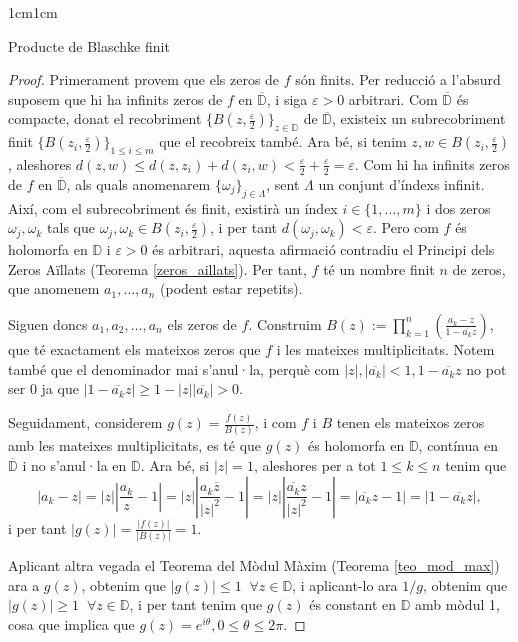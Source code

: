 \begin{adjustwidth}{1cm}{1cm}
\begin{subsection}{Producte de Blaschke finit}
\begin{proof}
        Primerament provem que els zeros de $f$ són finits. Per reducció a l'absurd suposem que hi ha infinits zeros de $f$ en $\overline{\mathbb{D}}$, i siga $\varepsilon>0$ arbitrari. Com $\overline{\mathbb{D}}$ és compacte, donat el recobriment $\{B(z,\frac{\varepsilon}{2})\}_{z\in \mathbb{D}}$ de $\overline{\mathbb{D}}$, existeix un subrecobriment finit $\{B(z_i,\frac{\varepsilon}{2})\}_{1\leq i\leq m}$ que el recobreix també.
        Ara bé, si tenim $z,w\in B(z_i,\frac{\varepsilon}{2})$, aleshores $d(z,w)\leq d(z,z_i)+d(z_i,w)<\frac{\varepsilon}{2}+\frac{\varepsilon}{2}=\varepsilon$. Com hi ha infinits zeros de $f$ en $\overline{\mathbb{D}}$, als quals anomenarem $\{\omega_j\}_{j\in\Lambda}$, sent $\Lambda$ un conjunt d'índexs infinit. Així, com el subrecobriment és finit, existirà un índex $i\in\{1,\dots,m\}$ i dos zeros $\omega_j, \omega_k$ tals que $\omega_j, \omega_k\in B(z_i,\frac{\varepsilon}{2})$, i per tant $d(\omega_j, \omega_k)<\varepsilon$. Pero com $f$ és holomorfa en $\mathbb{D}$ i $\varepsilon>0$ és arbitrari, aquesta afirmació contradiu el Principi dels Zeros Aïllats (Teorema \ref{zeros_aillats}). Per tant, $f$ té un nombre finit $n$ de zeros, que anomenem $a_1,\dots, a_n$ (podent estar repetits).

        Siguen doncs $a_1,a_2,\dots,a_n$ els zeros de $f$. Construim $B(z):=\displaystyle\prod^{n}_{k=1}\left(\frac{a_k-z}{1-\overline{a_k}z}\right)$, que té exactament els mateixos zeros que $f$ i les mateixes multiplicitats. Notem també que el denominador mai s'anul·la, perquè com $|z|,|\overline{a_k}|<1, 1-\overline{a_k}z$ no pot ser $0$ ja que $|1-\overline{a_k}z|\geq 1-|z||\overline{a_k}|>0$.

        Seguidament, considerem $g(z)=\frac{f(z)}{B(z)}$, i com $f$ i $B$ tenen els mateixos zeros amb les mateixes multiplicitats, es té que $g(z)$ és holomorfa en $\mathbb{D}$, contínua en $\overline{\mathbb{D}}$ i no s'anul·la en $\mathbb{D}$. Ara bé, si $|z|=1$, aleshores per a tot $1\leq k\leq n$ tenim que 
        \[
            |a_k-z|=|z|\left|\frac{a_k}{z}-1\right|=|z|\left|\frac{a_k\overline{z}}{|z|^2}-1\right|=|z|\left|\frac{\overline{a_k}z}{|z|^2}-1\right|=|\overline{a_k}z-1|=|1-\overline{a_k}z|,
        \]
        i per tant $|g(z)|=\frac{|f(z)|}{|B(z)|}=1$.

        Aplicant altra vegada el Teorema del Mòdul Màxim (Teorema \ref{teo_mod_max}) ara a $g(z)$, obtenim que $|g(z)|\leq 1 \;\; \forall z\in \mathbb{D}$, i aplicant-lo ara $1/g$, obtenim que $|g(z)|\geq 1\;\; \forall z\in \mathbb{D}$, i per tant tenim que $g(z)$ és constant en $\mathbb{D}$ amb mòdul 1, cosa que implica que $g(z)=e^{i\theta}, 0\leq \theta \leq 2\pi$. 


\end{proof}
\end{subsection}
\end{adjustwidth}
